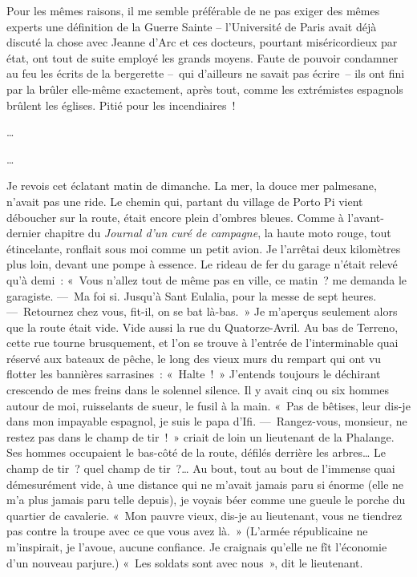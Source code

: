 \documentclass[french,twoside]{book} %
\begin{document}
Pour les mêmes raisons, il me semble préférable de ne pas exiger des mêmes experts une définition de la Guerre Sainte – l’Université de Paris avait déjà discuté la chose avec Jeanne d’Arc et ces docteurs, pourtant miséricordieux par état, ont tout de suite employé les grands moyens. Faute de pouvoir condamner au feu les écrits de la bergerette – qui d’ailleurs ne savait pas écrire – ils ont fini par la brûler elle-même exactement, après tout, comme les extrémistes espagnols brûlent les églises. Pitié pour les incendiaires !\par
…\par
…\par
Je revois cet éclatant matin de dimanche. La mer, la douce mer palmesane, n’avait pas une ride. Le chemin qui, partant du village de Porto Pi vient déboucher sur la route, était encore plein d’ombres bleues. Comme à l’avant-dernier chapitre du \emph{Journal d’un curé de campagne}, la haute moto rouge, tout étincelante, ronflait sous moi comme un petit avion. Je l’arrêtai deux kilomètres plus loin, devant une pompe à essence. Le rideau de fer du garage n’était relevé qu’à demi : « Vous n’allez tout de même pas en ville, ce matin ? me demanda le garagiste. — Ma foi si. Jusqu’à Sant Eulalia, pour la messe de sept heures. — Retournez chez vous, fit-il, on se bat là-bas. » Je m’aperçus seulement alors que la route était vide. Vide aussi la rue du Quatorze-Avril. Au bas de Terreno, cette rue tourne brusquement, et l’on se trouve à l’entrée de l’interminable quai réservé aux bateaux de pêche, le long des vieux murs du rempart qui ont vu flotter les bannières sarrasines : « Halte ! » J’entends toujours le déchirant crescendo de mes freins dans le solennel silence. Il y avait cinq ou six hommes autour de moi, ruisselants de sueur, le fusil à la main. « Pas de bêtises, leur dis-je dans mon impayable espagnol, je suis le papa d’Ifi. — Rangez-vous, monsieur, ne restez pas dans le champ de tir ! » criait de loin un lieutenant de la Phalange. Ses hommes occupaient le bas-côté de la route, défilés derrière les arbres… Le champ de tir ? quel champ de tir ?… Au bout, tout au bout de l’immense quai démesurément vide, à une distance qui ne m’avait jamais paru si énorme (elle ne m’a plus jamais paru telle depuis), je voyais béer comme une gueule le porche du quartier de cavalerie. « Mon pauvre vieux, dis-je au lieutenant, vous ne tiendrez pas contre la troupe avec ce que vous avez là. » (L’armée républicaine ne m’inspirait, je l’avoue, aucune confiance. Je craignais qu’elle ne fît l’économie d’un nouveau parjure.) « Les soldats sont avec nous », dit le lieutenant.\par
\end{document}
